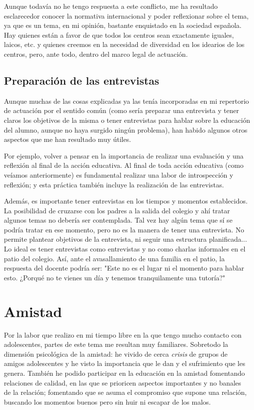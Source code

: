 Aunque todavía no he tengo respuesta a este conflicto, me ha resultado esclarecedor conocer la normativa internacional y poder reflexionar sobre el tema, ya que es un tema, en mi opinión, bastante enquistado en la sociedad española.
%
Hay quienes están a favor de que todos los centros sean exactamente iguales, laicos, etc. y quienes creemos en la necesidad de diversidad en los idearios de los centros, pero, ante todo, dentro del marco legal de actuación.

\subsection{Preparación de las entrevistas}

Aunque muchas de las cosas explicadas ya las tenía incorporadas en mi repertorio de actuación por el sentido común (como sería preparar una entrevista y tener claros los objetivos de la misma o tener entrevistas para hablar sobre la educación del alumno, aunque no haya surgido ningún problema), han habido algunos otros aspectos que me han resultado muy útiles.

Por ejemplo, volver a pensar en la importancia de realizar una evaluación y una reflexión al final de la acción educativa.
%
Al final de toda acción educativa (como veíamos anteriormente) es fundamental realizar una labor de introspección y reflexión; y esta práctica también incluye la realización de las entrevistas.

Además, es importante tener entrevistas en los tiempos y momentos establecidos.
%
La posibilidad de cruzarse con los padres a la salida del colegio y ahí tratar algunos temas no debería ser contemplada.
%
Tal vez hay algún tema que sí se podría tratar en ese momento, pero no es la manera de tener una entrevista.
%
No permite plantear objetivos de la entrevista, ni seguir una estructura planificada...
%
Lo ideal es tener entrevistas como entrevistas y no como charlas informales en el patio del colegio.
%
Así, ante el avasallamiento de una familia en el patio, la respuesta del docente podría ser: "Este no es el lugar ni el momento para hablar esto. ¿Porqué no te vienes un día y tenemos tranquilamente una tutoría?"




\newpage
\section{Amistad}


Por la labor que realizo en mi tiempo libre en la que tengo mucho contacto con adolescentes, partes de este tema me resultan muy familiares.
%
Sobretodo la dimensión psicológica de la amistad: 
%
he vivido de cerca \textit{crisis} de grupos de amigos adolescentes y he visto la importancia que le dan y el sufrimiento que les genera.
%
También he podido participar en la educación en la amistad fomentando relaciones de calidad, en las que se prioricen aspectos importantes y no banales de la relación; fomentando que se asuma el compromiso que supone una relación, buscando los momentos buenos pero sin huir ni escapar de los malos.

